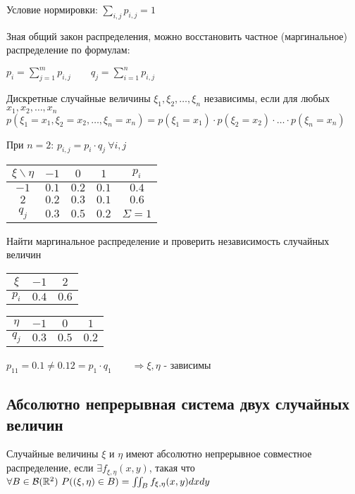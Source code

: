 \documentclass[12pt]{article}
\begin{document}
    Условие нормировки: $\sum_{i, j} p_{i, j} = 1$

    Зная общий закон распределения, можно восстановить частное (маргинальное) распределение по формулам: 

    $p_i = \sum_{j = 1}^m p_{i, j} \qquad q_j = \sum_{i = 1}^n p_{i, j}$

    \Def Дискретные случайные величины $\xi_1, \xi_2, \dots, \xi_n$ независимы, если для любых $x_1, x_2, \dots, x_n$ 
    $p(\xi_1 = x_1, \xi_2 = x_2, \dots, \xi_n = x_n) = p(\xi_1 = x_1) \cdot p(\xi_2 = x_2) \cdot \dots \cdot p(\xi_n = x_n)$

    При $n = 2$: $p_{i, j} = p_i \cdot q_j \ \forall i, j$

    \Ex

    \begin{tabular}{c|c|c|c|c}
        $\xi \backslash \eta$ & $-1$ & $0$ & $1$ & $p_i$ \\
        \hline
        $-1$ & $0.1$ & $0.2$ & $0.1$ & $0.4$ \\
        \hline
        $2$ & $0.2$ & $0.3$ & $0.1$ & $0.6$ \\
        \hline
        $q_j$ & $0.3$ & $0.5$ & $0.2$ & $\Sigma = 1$ \\
    \end{tabular}

    Найти маргинальное распределение и проверить независимость случайных величин


    \begin{tabular}{c|c|c}
        $\xi$ & $-1$ & $2$ \\
        \hline
        $p_i$ & $0.4$ & $0.6$  \\
    \end{tabular}

    \begin{tabular}{c|c|c|c}
        $\eta$ & $-1$ & $0$ & $1$ \\
        \hline
        $q_j$ & $0.3$ & $0.5$ & $0.2$  \\
    \end{tabular}

    $p_{11} = 0.1 \neq 0.12 = p_1 \cdot q_1 \qquad \Longrightarrow \xi, \eta$ - зависимы

    \subsection{Абсолютно непрерывная система двух случайных величин}

    \Def Случайные величины $\xi$ и $\eta$ имеют абсолютно непрерывное совместное распределение, если
    $\exists f_{\xi, \eta}(x, y)$, такая что $\forall B \in \mathcal{B}(\mathbb{R}^2) \ P((\xi, \eta) \in B) = \iint_B f_{\xi, \eta}(x, y) dxdy$
\end{document}
